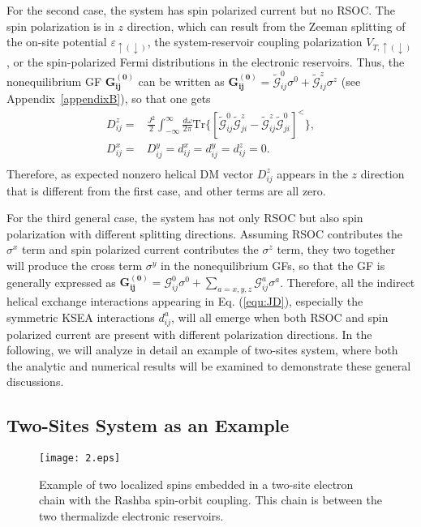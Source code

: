 \documentclass[aps,prb,twocolumn,showpacs,amssymb]{revtex4-1}
\begin{document}
For the second case, the system has spin polarized current but no RSOC. The spin polarization is in $z$ direction, which can result from the Zeeman splitting of the on-site  potential $\varepsilon_{\uparrow(\downarrow)}$, the system-reservoir coupling polarization $V_{T,\uparrow(\downarrow)}$, or the spin-polarized Fermi distributions in the electronic reservoirs. Thus, the nonequilibrium GF $\bm{G^{(0)}_{ij}}$ can be written as $\bm{G^{(0)}_{ij}}=\tilde{\mathcal{G}}^{0}_{ij}\sigma^{0}+\tilde{\mathcal{G}}^{z}_{ij}\sigma^{z}$ (see Appendix~\ref{appendixB}), so that one gets
\begin{equation}\label{equ:Esd6}
\begin{aligned}
D^{z}_{ij}=&\frac{J^2}{2}\int^{\infty}_{-\infty}\frac{d\omega}{2\pi}\mathrm{Tr}\{[\tilde{\mathcal{G}}^{0}_{ij}\tilde{\mathcal{G}}^{z}_{ji}-\tilde{\mathcal{G}}^{z}_{ij}\tilde{\mathcal{G}}^{0}_{ji}]^{<}\},\\
D^{x}_{ij}=&D^{y}_{ij}=d^{x}_{ij}=d^{y}_{ij}=d^{z}_{ij}=0.\\
\end{aligned}
\end{equation}
Therefore, as expected nonzero helical DM vector $D^{z}_{ij}$ appears in the $z$ direction that is different from the first case, and other terms are all zero.

For the third general case, the system has not only RSOC but also spin polarization with different splitting directions. Assuming RSOC contributes the $\sigma^x$ term and spin polarized current contributes the $\sigma^z$ term, they two together will produce the cross term $\sigma^y$ in the nonequilibrium GFs, so that the GF is generally expressed as $\bm{G^{(0)}_{ij}}=\mathcal{G}^{0}_{ij}\sigma^{0}+\sum_{a=x,y,z}\mathcal{G}^{a}_{ij}\sigma^{a}$. Therefore, all the indirect helical exchange interactions appearing in Eq. (\ref{equ:JD}), especially the symmetric KSEA interactions $d^a_{ij}$, will all emerge when both RSOC and spin polarized current are present with different polarization directions. In the following, we will analyze in detail an example of two-sites system, where both the analytic and numerical results will be examined to demonstrate these general discussions.


\subsection{Two-Sites System as an Example}\label{sec:result}
\begin{figure}[!htp]
\texttt{[image: 2.eps]}
\vspace{-0.6cm}
\caption{Example of two localized spins embedded in a two-site electron chain with the Rashba spin-orbit coupling. This chain is between the two thermalizde electronic reservoirs.}\label{fig:2}
\end{figure}
\end{document}

